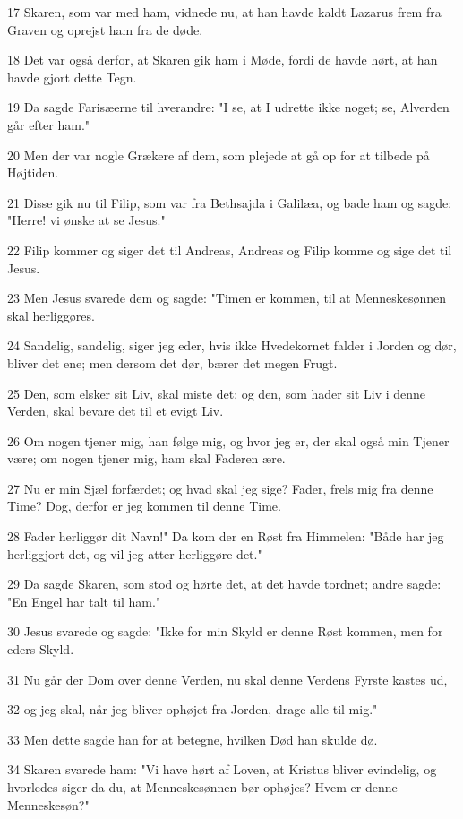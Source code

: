 \par 17 Skaren, som var med ham, vidnede nu, at han havde kaldt Lazarus frem fra Graven og oprejst ham fra de døde.
\par 18 Det var også derfor, at Skaren gik ham i Møde, fordi de havde hørt, at han havde gjort dette Tegn.
\par 19 Da sagde Farisæerne til hverandre: "I se, at I udrette ikke noget; se, Alverden går efter ham."
\par 20 Men der var nogle Grækere af dem, som plejede at gå op for at tilbede på Højtiden.
\par 21 Disse gik nu til Filip, som var fra Bethsajda i Galilæa, og bade ham og sagde: "Herre! vi ønske at se Jesus."
\par 22 Filip kommer og siger det til Andreas, Andreas og Filip komme og sige det til Jesus.
\par 23 Men Jesus svarede dem og sagde: "Timen er kommen, til at Menneskesønnen skal herliggøres.
\par 24 Sandelig, sandelig, siger jeg eder, hvis ikke Hvedekornet falder i Jorden og dør, bliver det ene; men dersom det dør, bærer det megen Frugt.
\par 25 Den, som elsker sit Liv, skal miste det; og den, som hader sit Liv i denne Verden, skal bevare det til et evigt Liv.
\par 26 Om nogen tjener mig, han følge mig, og hvor jeg er, der skal også min Tjener være; om nogen tjener mig, ham skal Faderen ære.
\par 27 Nu er min Sjæl forfærdet; og hvad skal jeg sige? Fader, frels mig fra denne Time? Dog, derfor er jeg kommen til denne Time.
\par 28 Fader herliggør dit Navn!" Da kom der en Røst fra Himmelen: "Både har jeg herliggjort det, og vil jeg atter herliggøre det."
\par 29 Da sagde Skaren, som stod og hørte det, at det havde tordnet; andre sagde: "En Engel har talt til ham."
\par 30 Jesus svarede og sagde: "Ikke for min Skyld er denne Røst kommen, men for eders Skyld.
\par 31 Nu går der Dom over denne Verden, nu skal denne Verdens Fyrste kastes ud,
\par 32 og jeg skal, når jeg bliver ophøjet fra Jorden, drage alle til mig."
\par 33 Men dette sagde han for at betegne, hvilken Død han skulde dø.
\par 34 Skaren svarede ham: "Vi have hørt af Loven, at Kristus bliver evindelig, og hvorledes siger da du, at Menneskesønnen bør ophøjes? Hvem er denne Menneskesøn?"
